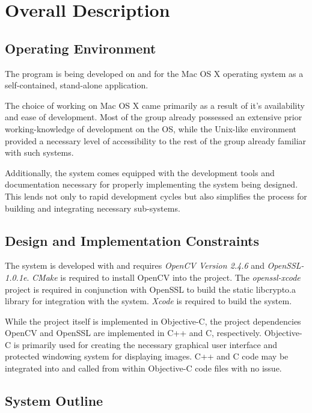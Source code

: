 \documentclass[11pt, a4paper,titlepage]{report}
\begin{document}
\chapter{Overall Description}
\section{Operating Environment}
The program is being developed on and for the Mac OS X operating system as a self-contained, stand-alone application.

The choice of working on Mac OS X came primarily as a result of it's availability and ease of development. Most of the group already possessed an extensive prior working-knowledge of development on the OS, while the Unix-like environment provided a necessary level of accessibility to the rest of the group already familiar with such systems.

Additionally, the system comes equipped with the development  tools and documentation necessary for properly implementing the system being designed. This lends not only to rapid development cycles but also simplifies the process for building and integrating necessary sub-systems.

\section{Design and Implementation Constraints}
The system is developed with and requires \emph{OpenCV Version 2.4.6} and \emph{OpenSSL-1.0.1e}. \emph{CMake} \cite{software:cmake} is required to install OpenCV into the project. The \emph{openssl-xcode} \cite{software:ssl-xcode} project is required in conjunction with OpenSSL to build the static libcrypto.a library for integration with the system. \emph{Xcode} is required to build the system.

While the project itself is implemented in Objective-C, the project dependencies OpenCV and OpenSSL are implemented in C++ and C, respectively. Objective-C is primarily used for creating the necessary graphical user interface and protected windowing system for displaying images. C++ and C code may be integrated into and called from within Objective-C code files with no issue.

\section{System Outline}
\end{document}
